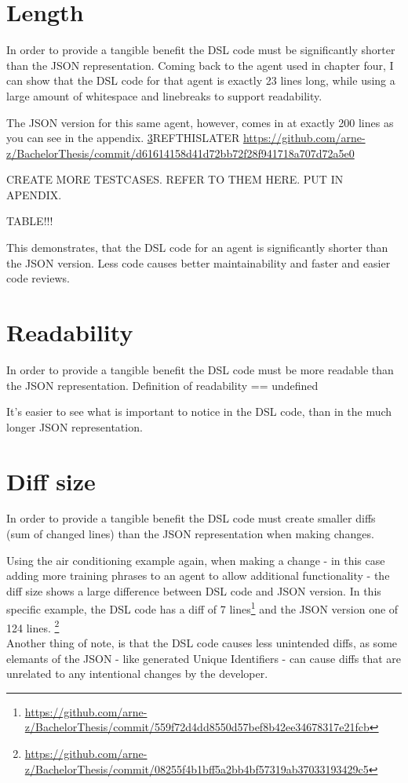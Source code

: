 \section{Length}

In order to provide a tangible benefit the DSL code must be significantly shorter than the JSON representation. Coming back to the agent used in chapter four, I can show that the DSL code for that agent is exactly 23 lines long, while using a large amount of whitespace and linebreaks to support readability.

The JSON version for this same agent, however, comes in at exactly 200 lines as you can see in the appendix. \ref{}REFTHISLATER \url{https://github.com/arne-z/BachelorThesis/commit/d61614158d41d72bb72f28f941718a707d72a5e0}

CREATE MORE TESTCASES. REFER TO THEM HERE. PUT IN APENDIX.

TABLE!!!


This demonstrates, that the DSL code for an agent is significantly shorter than the JSON version. Less code causes better maintainability and faster and easier code reviews. 

\section{Readability}
In order to provide a tangible benefit the DSL code must be more readable than the JSON representation.
\citeNeeded Definition of readability == undefined

It's easier to see what is important to notice in the DSL code, than in the much longer JSON representation.



\section{Diff size}
In order to provide a tangible benefit the DSL code must create smaller diffs (sum of changed lines) than the JSON representation when making changes.

Using the air conditioning example again, when making a change - in this case adding more training phrases to an agent to allow additional functionality - the diff size shows a large difference between DSL code and JSON version. In this specific example, the DSL code has a diff of 7 lines\footnote{\url{https://github.com/arne-z/BachelorThesis/commit/559f72d4dd8550d57bef8b42ee34678317e21fcb}} and the JSON version one of 124 lines.
\footnote{\url{https://github.com/arne-z/BachelorThesis/commit/08255f4b1bff5a2bb4bf57319ab37033193429c5}}\\
Another thing of note, is that the DSL code causes less unintended diffs, as some elemants of the JSON - like generated Unique Identifiers - can cause diffs that are unrelated to any intentional changes by the developer.



